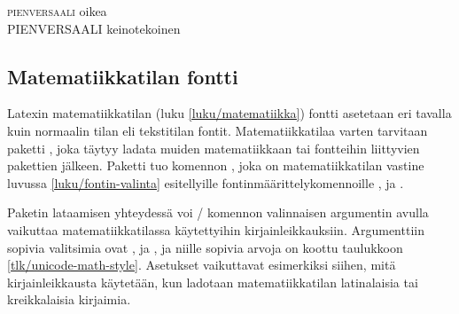 \begin{tulossis}
  \textsc{pienversaali} oikea \\
  {
    PIENVERSAALI} keinotekoinen
\end{tulossis}

\subsection{Matematiikkatilan fontti}
\label{luku/matematiikka-fontit}

Latexin matematiikkatilan (luku \ref{luku/matematiikka}) fontti
asetetaan eri tavalla kuin normaalin tilan eli tekstitilan fontit.
Matematiikkatilaa varten tarvitaan paketti ,
joka täytyy ladata muiden matematiikkaan tai fontteihin liittyvien
pakettien jälkeen. Paketti tuo komennon , joka on
matematiikkatilan vastine luvussa \ref{luku/fontin-valinta} esitellyille
fontinmäärittelykomennoille , 
ja .

\begin{koodilohkosis}
\usepackage{fontspec}
\usepackage{unicode-math}
\setmainfont{TeX Gyre Pagella}       %
\end{koodilohkosis}


\noindent
Paketin  lataamisen yhteydessä voi
\-/ komennon valinnaisen argumentin avulla vaikuttaa
matematiikkatilassa käytettyihin kirjainleikkauksiin. Argumenttiin
sopivia valitsimia ovat ,  ja
, ja niille sopivia arvoja on koottu taulukkoon
\ref{tlk/unicode-math-style}. Asetukset vaikuttavat esimerkiksi siihen,
mitä kirjainleikkausta käytetään, kun ladotaan matematiikkatilan
latinalaisia tai kreikkalaisia kirjaimia.

